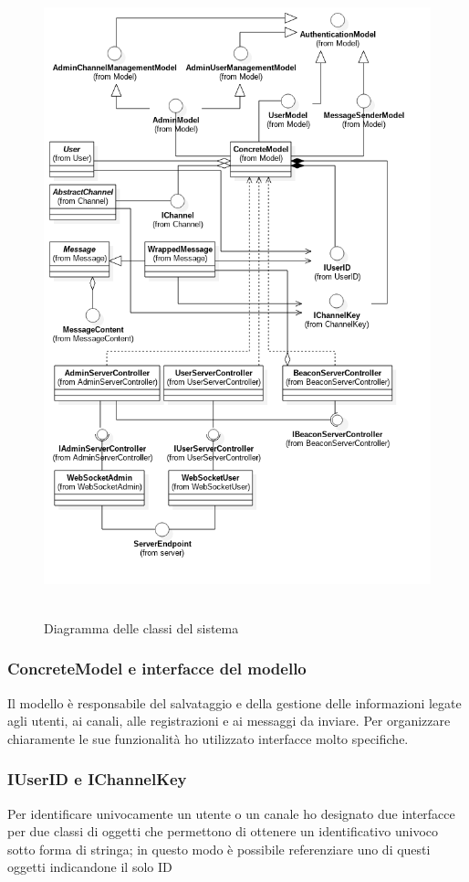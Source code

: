 	\begin{figure}[H]
		\begin{center}
			\includegraphics[height=18.5cm,keepaspectratio]{UML/png/Design Model__SimpleClasses_6}
			\caption{Diagramma delle classi del sistema}\label{diagrammaclassi}
		\end{center}
	\end{figure}

		\subsubsection{ConcreteModel e interfacce del modello}
	Il modello è responsabile del salvataggio e della gestione delle informazioni legate agli utenti, ai canali, alle registrazioni e ai messaggi da inviare. Per organizzare chiaramente le sue funzionalità ho utilizzato interfacce molto specifiche.

		\subsubsection{IUserID e IChannelKey}
	Per identificare univocamente un utente o un canale ho designato due interfacce per due classi di oggetti che permettono di ottenere un identificativo univoco sotto forma di stringa; in questo modo è possibile referenziare uno di questi oggetti indicandone il solo ID

